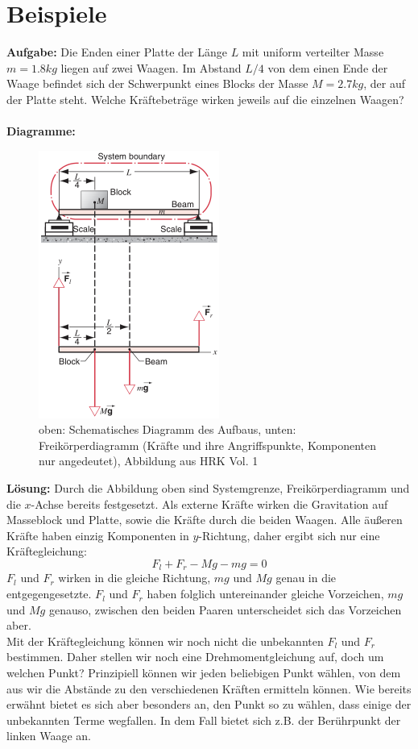 \documentclass[11pt]{article}
\begin{document}
\section{Beispiele}
\textbf{Aufgabe:} Die Enden einer Platte der Länge $L$ mit uniform verteilter Masse $m = 1.8kg$ liegen auf zwei Waagen. Im Abstand $L/4$ von dem einen Ende der Waage befindet sich der Schwerpunkt eines Blocks der Masse $M = 2.7kg$, der auf der Platte steht. Welche Kräftebeträge wirken jeweils auf die einzelnen Waagen? \\\\
\textbf{Diagramme:}
\begin{figure}[H] 
        \centering
        \includegraphics{abb/1-statik-rot-tra/aufgabe-1.png}
        \caption{oben: Schematisches Diagramm des Aufbaus, unten: Freikörperdiagramm (Kräfte und ihre Angriffspunkte, Komponenten nur angedeutet), Abbildung aus HRK Vol. 1}
\end{figure}
\noindent\textbf{Lösung:} Durch die Abbildung oben sind Systemgrenze, Freikörperdiagramm und die $x$-Achse bereits festgesetzt. Als externe Kräfte wirken die Gravitation auf Masseblock und Platte, sowie die Kräfte durch die beiden Waagen. Alle äußeren Kräfte haben einzig Komponenten in $y$-Richtung, daher ergibt sich nur eine Kräftegleichung: 
\begin{equation}
        F_l + F_r - Mg - mg = 0
\end{equation}
$F_l$ und $F_r$ wirken in die gleiche Richtung, $mg$ und $Mg$ genau in die entgegengesetzte. $F_l$ und $F_r$ haben folglich untereinander gleiche Vorzeichen, $mg$ und $Mg$ genauso, zwischen den beiden Paaren unterscheidet sich das Vorzeichen aber. \\
Mit der Kräftegleichung können wir noch nicht die unbekannten $F_l$ und $F_r$ bestimmen. Daher stellen wir noch eine Drehmomentgleichung auf, doch um welchen Punkt? Prinzipiell können wir jeden beliebigen Punkt wählen, von dem aus wir die Abstände zu den verschiedenen Kräften ermitteln können. Wie bereits erwähnt bietet es sich aber besonders an, den Punkt so zu wählen, dass einige der unbekannten Terme wegfallen. In dem Fall bietet sich z.B. der Berührpunkt der linken Waage an. \\
\end{document}

